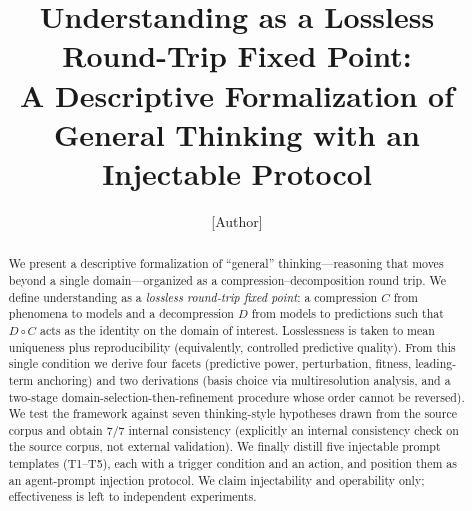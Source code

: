 \documentclass[11pt]{article}
\title{Understanding as a Lossless Round-Trip Fixed Point:\\
A Descriptive Formalization of General Thinking with an Injectable Protocol}
\author{[Author]}
\date{}
\newcommand{\Cmap}{C}
\newcommand{\Dmap}{D}
\begin{document}
\maketitle

\begin{abstract}
We present a descriptive formalization of ``general'' thinking---reasoning that
moves beyond a single domain---organized as a compression--decomposition round
trip. We define understanding as a \emph{lossless round-trip fixed point}: a
compression $\Cmap$ from phenomena to models and a decompression $\Dmap$ from
models to predictions such that $\Dmap\circ\Cmap$ acts as the identity on the
domain of interest. Losslessness is taken to mean uniqueness plus reproducibility
(equivalently, controlled predictive quality). From this single condition we
derive four facets (predictive power, perturbation, fitness, leading-term
anchoring) and two derivations (basis choice via multiresolution analysis, and a
two-stage domain-selection-then-refinement procedure whose order cannot be
reversed). We test the framework against seven thinking-style hypotheses drawn
from the source corpus and obtain 7/7 internal consistency (explicitly an
internal consistency check on the source corpus, not external validation). We
finally distill five injectable prompt templates (T1--T5), each with a trigger
condition and an action, and position them as an agent-prompt injection protocol.
We claim injectability and operability only; effectiveness is left to independent
experiments.
\end{abstract}
\end{document}
